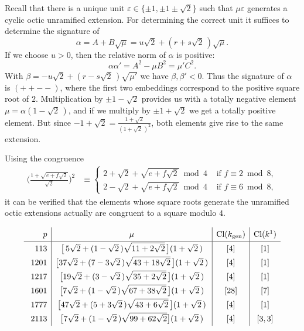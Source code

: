 \documentclass{amsart}
\newcommand{\rsp}{\raisebox{0em}[2.7ex][1.3ex]{\rule{0em}{2ex} }}
\newcommand{\Cl}{{\operatorname{Cl}}}
\newcommand{\gen}{{\operatorname{gen}}}
\newcommand{\eps}{\varepsilon}
\begin{document}
Recall that there is a unique unit $\eps \in \{\pm 1, \pm 1 \pm \sqrt{2}\}$
such that $\mu \eps$ generates a cyclic octic unramified extension.
For determining the correct unit it suffices to determine the
signature of
$$ \alpha = A + B \sqrt{\mu} = u\sqrt{2} + (r+s\sqrt{2}\,) \sqrt{\mu}. $$
If we choose $u > 0$, then the relative norm of $\alpha$ is positive:
$$ \alpha \alpha' =  A^2 - \mu B^2 = \mu' C^2. $$
With $\beta = -u\sqrt{2} + (r-s\sqrt{2}\,) \sqrt{\mu'}$
we have $\beta, \beta' < 0$. 
Thus the signature of $\alpha$ is $(++--)$, where the first two embeddings
correspond to the positive square root of $2$. Multiplication
by $\pm 1 - \sqrt{2}$ provides us with a totally negative element
$\mu = \alpha(1 - \sqrt{2}\,)$, and if we multiply by $\pm 1 + \sqrt{2}$
we get a totally positive element. But since
$-1 + \sqrt{2} = \frac{1+\sqrt{2}}{(1+\sqrt{2}\,)^2}$, both elements
give rise to the same extension.

Uising the congruence
\begin{align*}
  \Big(\frac{1 + \sqrt{e+f\sqrt{2}}}{\sqrt{2}}\Big)^2
  & \equiv \begin{cases}
    2 + \sqrt{2} + \sqrt{e+f\sqrt{2}} \bmod 4
                 & \text{ if } f \equiv 2 \bmod 8, \\
    2 - \sqrt{2} + \sqrt{e+f\sqrt{2}} \bmod 4
                 & \text{ if } f \equiv 6 \bmod 8,
  \end{cases}
\end{align*}
it can be verified that the elements whose square roots generate
the unramified octic extensions actually are congruent to a square
modulo $4$.

\begin{table}[ht!]
  $$ \begin{array}{r|c|c|c}    
    \rsp  p  & \mu & \Cl(k_\gen) & \Cl(k^1) \\ \hline
    \rsp 113 & \big[\,5 \sqrt{2} + (1 - \sqrt{2}\,)\sqrt{11 + 2\sqrt{2}}\,\big]
    (1 + \sqrt{2}\,)  & [4] & [1] \\
    \rsp 1201 & \big[37\sqrt{2} + (7 -3\sqrt{2}\,) \sqrt{43 + 18\sqrt{2}}\,\big]
    (1 + \sqrt{2}\,) & [4] & [1] \\
    \rsp 1217 & \big[19\sqrt{2} + (3 -\sqrt{2}\,) \sqrt{35+2\sqrt{2}}\,\big] 
    (1 + \sqrt{2}\,) & [4] & [1] \\  
    \rsp 1601 & \big[7\sqrt{2} + (1 - \sqrt{2}\,) \sqrt{67+38\sqrt{2}}\,\big]
    (1 + \sqrt{2}\,) & [28] & [7]   \\
    \rsp 1777 & \big[47\sqrt{2} + (5+3\sqrt{2}\,)\sqrt{43+6\sqrt{2}}\,\big]
    (1 + \sqrt{2}\,) & [4] & [1] \\
    \rsp 2113 & \big[ 7\sqrt{2} + (1-\sqrt{2}\,) \sqrt{99+62\sqrt{2}}\big]
    (1 + \sqrt{2}\,) & [4] & [3,3] \\
  \end{array} $$
  \caption{Totally real unramified cyclic octic extensions}\label{Tab3}
\end{table}
\end{document}
